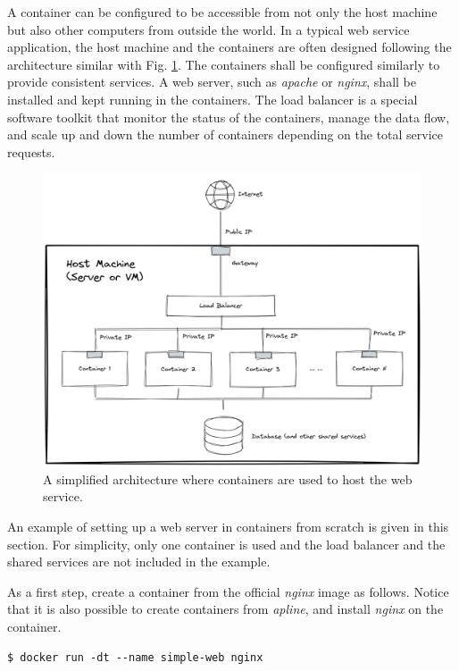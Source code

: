 A container can be configured to be accessible from not only the host machine but also other computers from outside the world. In a typical web service application, the host machine and the containers are often designed following the architecture similar with Fig. \ref{ch:vac:fig:containerwebserverarchitecture}. The containers shall be configured similarly to provide consistent services. A web server, such as \textit{apache} or \textit{nginx}, shall be installed and kept running in the containers. The load balancer is a special software toolkit that monitor the status of the containers, manage the data flow, and scale up and down the number of containers depending on the total service requests.
\begin{figure}
	\centering
	\includegraphics[width=350pt]{chapters/ch_virtualization_and_containerization/figures/containerwebserverarchitecture.png}
	\caption{A simplified architecture where containers are used to host the web service.} \label{ch:vac:fig:containerwebserverarchitecture}
\end{figure}

An example of setting up a web server in containers from scratch is given in this section. For simplicity, only one container is used and the load balancer and the shared services are not included in the example.

As a first step, create a container from the official \textit{nginx} image as follows. Notice that it is also possible to create containers from \textit{apline}, and install \textit{nginx} on the container.
\begin{lstlisting}
$ docker run -dt --name simple-web nginx
\end{lstlisting}

